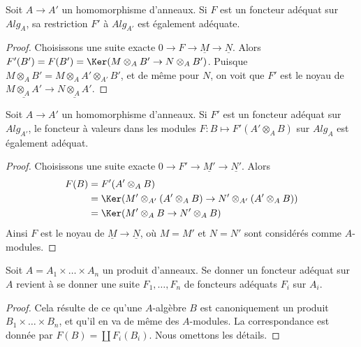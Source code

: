 \begin{lemma}
\label{lemma-base-change-adequate}
Soit $A \to A'$ un homomorphisme d'anneaux. Si $F$ est un foncteur adéquat sur
$\textit{Alg}_A$, sa restriction $F'$ à
$\textit{Alg}_{A'}$ est également adéquate.
\end{lemma}

\begin{proof}
Choisissons une suite exacte $0 \to F \to \underline{M} \to \underline{N}$.
Alors $F'(B') = F(B') = \Ker(M \otimes_A B' \to N \otimes_A B')$.
Puisque $M \otimes_A B' = M \otimes_A A' \otimes_{A'} B'$, et de même
pour $N$, on voit que $F'$ est le noyau de
$\underline{M \otimes_A A'} \to \underline{N \otimes_A A'}$.
\end{proof}

\begin{lemma}
\label{lemma-pushforward-adequate}
Soit $A \to A'$ un homomorphisme d'anneaux. Si $F'$ est un foncteur adéquat sur
$\textit{Alg}_{A'}$, le foncteur à valeurs dans les modules
$F : B \mapsto F'(A' \otimes_A B)$ sur $\textit{Alg}_A$ est également adéquat.
\end{lemma}

\begin{proof}
Choisissons une suite exacte $0 \to F' \to \underline{M'} \to \underline{N'}$.
Alors
\begin{align*}
F(B) & = F'(A' \otimes_A B) \\
& = \Ker(M' \otimes_{A'} (
A' \otimes_A B) \to N' \otimes_{A'} (A' \otimes_A B)) \\
& = \Ker(M' \otimes_A B \to N' \otimes_A B)
\end{align*}
Ainsi $F$ est le noyau de
$\underline{M} \to \underline{N}$,
où $M = M'$ et $N = N'$ sont considérés comme $A$-modules.
\end{proof}

\begin{lemma}
\label{lemma-adequate-product}
Soit $A = A_1 \times \ldots \times A_n$ un produit d'anneaux.
Se donner un foncteur adéquat sur $A$ revient à se donner une suite
$F_1, \ldots, F_n$ de foncteurs adéquats $F_i$ sur $A_i$.
\end{lemma}

\begin{proof}
Cela résulte de ce qu'une $A$-algèbre $B$ est canoniquement un produit
$B_1 \times \ldots \times B_n$, et qu'il en va de même des $A$-modules.
La correspondance est donnée par $F(B) = \coprod F_i(B_i)$.
Nous omettons les détails.
\end{proof}

